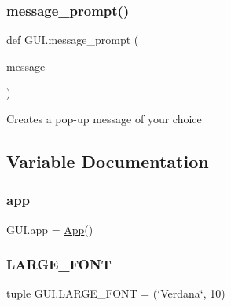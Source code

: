 \subsubsection{\texorpdfstring{message\_prompt()}{message\_prompt()}}
{\footnotesize\ttfamily def G\+U\+I.\+message\+\_\+prompt (\begin{DoxyParamCaption}\item[{}]{message }\end{DoxyParamCaption})}

\begin{DoxyVerb}Creates a pop-up message of your choice\end{DoxyVerb}
 

\subsection{Variable Documentation}
\mbox{\label{namespace_g_u_i_aa8865a45ffd83d7c6062a02c169bc287}} 
\subsubsection{\texorpdfstring{app}{app}}
{\footnotesize\ttfamily G\+U\+I.\+app = \mbox{\hyperlink{class_g_u_i_1_1_app}{App}}()}

\mbox{\label{namespace_g_u_i_a0a43ec6a3ff3feb9855ba08afbe1cff4}} 
\subsubsection{\texorpdfstring{LARGE\_FONT}{LARGE\_FONT}}
{\footnotesize\ttfamily tuple G\+U\+I.\+L\+A\+R\+G\+E\+\_\+\+F\+O\+NT = (\char`\"{}Verdana\char`\"{}, 10)}

